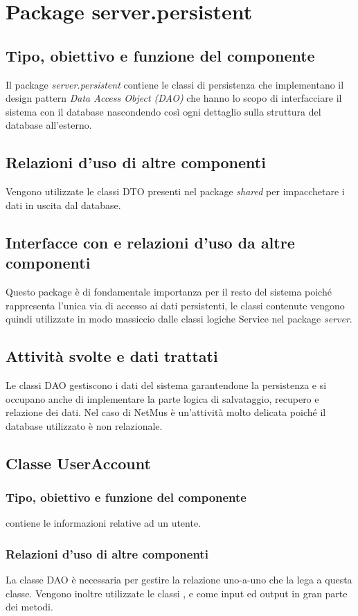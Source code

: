 \section{Package server.persistent} %
\subsection*{Tipo, obiettivo e funzione del componente}
Il package \emph{server.persistent} contiene le classi di persistenza che
implementano il design pattern \emph{Data Access Object (DAO)} che hanno lo
scopo di interfacciare il sistema con il database nascondendo cos\`i ogni
dettaglio sulla struttura del database all'esterno. 
\subsection*{Relazioni d'uso di altre componenti}
Vengono utilizzate le classi DTO presenti nel package \emph{shared} per
impacchetare i dati in uscita dal database. 
\subsection*{Interfacce con e relazioni d'uso da altre componenti}
Questo package \`e di fondamentale importanza per il resto del sistema poich\'e
rappresenta l'unica via di accesso ai dati persistenti, le classi contenute
vengono quindi utilizzate in modo massiccio dalle classi logiche Service nel
package \emph{server}.
\subsection*{Attivit\`a svolte e dati trattati}
Le classi DAO gestiscono i dati del sistema garantendone la persistenza e si
occupano anche di implementare la parte logica di salvataggio, recupero e
relazione dei dati. Nel caso di NetMus \`e un'attivit\`a molto delicata poich\'e il
database utilizzato \`e non relazionale.

\subsection{Classe UserAccount}
\subsubsection*{Tipo, obiettivo e funzione del componente}
 contiene le informazioni relative ad un utente.
\subsubsection*{Relazioni d'uso di altre componenti}
La classe DAO  \`e necessaria per gestire la relazione uno-a-uno
che la lega a questa classe. Vengono inoltre utilizzate le classi
,  e  come input ed
output in gran parte dei metodi. 
